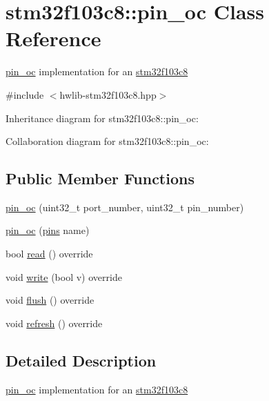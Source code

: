 \hypertarget{classstm32f103c8_1_1pin__oc}{}\section{stm32f103c8\+:\+:pin\+\_\+oc Class Reference}
\label{classstm32f103c8_1_1pin__oc}


\hyperlink{classstm32f103c8_1_1pin__oc}{pin\+\_\+oc} implementation for an \hyperlink{namespacestm32f103c8}{stm32f103c8}  




{\ttfamily \#include $<$hwlib-\/stm32f103c8.\+hpp$>$}



Inheritance diagram for stm32f103c8\+:\+:pin\+\_\+oc\+:


Collaboration diagram for stm32f103c8\+:\+:pin\+\_\+oc\+:
\subsection*{Public Member Functions}
\begin{DoxyCompactItemize}
\item 
\hyperlink{classstm32f103c8_1_1pin__oc_a3cc4f9798d977b88a71f27ba6419cfd6}{pin\+\_\+oc} (uint32\+\_\+t port\+\_\+number, uint32\+\_\+t pin\+\_\+number)
\item 
\hyperlink{classstm32f103c8_1_1pin__oc_a0a67da6f1d095169e5a82b25f3c9270b}{pin\+\_\+oc} (\hyperlink{namespacestm32f103c8_a69d642506db309a7e64295d35ec21ff6}{pins} name)
\item 
bool \hyperlink{classstm32f103c8_1_1pin__oc_ae733a459b1f10ca38ac20f2d60923833}{read} () override
\item 
void \hyperlink{classstm32f103c8_1_1pin__oc_a9e5f3ecc1c5aff4b4277ea33d26ef0c7}{write} (bool v) override
\item 
void \hyperlink{classstm32f103c8_1_1pin__oc_ac86dbc1c7430d2dbdee190ee87b2e35e}{flush} () override
\item 
void \hyperlink{classstm32f103c8_1_1pin__oc_a6f063df5c0c2a290ed095b26faab4aab}{refresh} () override
\end{DoxyCompactItemize}


\subsection{Detailed Description}
\hyperlink{classstm32f103c8_1_1pin__oc}{pin\+\_\+oc} implementation for an \hyperlink{namespacestm32f103c8}{stm32f103c8} 

